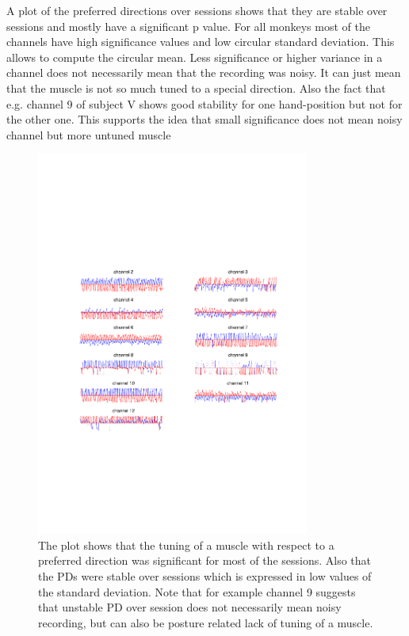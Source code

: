 A plot of the preferred directions over sessions shows that they are stable over sessions and mostly have a significant p value. For all monkeys most of the channels have high significance values and low circular standard deviation. This allows to compute the circular mean. Less significance or higher variance in a channel does not necessarily mean that the recording was noisy. It can just mean that the muscle is not so much tuned to a special direction. Also the fact that e.g. channel 9 of subject V shows good stability for one hand-position but not for the other one. This supports the idea that small significance does not mean noisy channel but more untuned muscle
\begin{figure}[ht]
    \centering
        \includegraphics[width=0.8\textwidth]{images/pd_consist_feather_vega.pdf}
    \caption{The plot shows that the tuning of a muscle with respect to a preferred direction was significant for most of the sessions. Also that the PDs were stable over sessions which is expressed in low values of the standard deviation. Note that for example channel 9 suggests that unstable PD over session does not necessarily mean noisy recording, but can also be posture related lack of tuning of a muscle.}
    \label{sg:fig:images_pd_consist_feather_allvega}
\end{figure}



